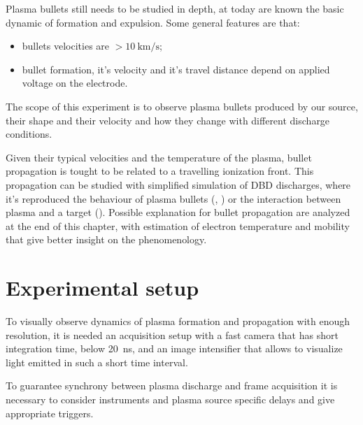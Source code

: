 Plasma bullets still needs to be studied in depth, at today are known the basic dynamic of formation and expulsion. Some general features are that:
\begin{itemize}
 \item bullets velocities are $> \SI{10}{\kilo\meter/\second}$;
 \item bullet formation, it's velocity and it's travel distance depend on applied voltage on the electrode.
\end{itemize}

The scope of this experiment is to observe plasma bullets produced by our source, their shape and their velocity and how they change with different discharge conditions.

Given their typical velocities and the temperature of the plasma, bullet propagation is tought to be related to a travelling ionization front. This propagation can be studied with simplified simulation of DBD discharges, where it's reproduced the behaviour of plasma bullets (\cite{doi:10.1063/1.4963115}, \cite{Breden_2012}) or the interaction between plasma and a target (\cite{doi:10.1063/1.4923345}). Possible explanation for bullet propagation are analyzed at the end of this chapter, with estimation of electron temperature and mobility that give better insight on the phenomenology.

\section{Experimental setup}
To visually observe dynamics of plasma formation and propagation with enough resolution, it is needed an acquisition setup with a fast camera that has short integration time, below \SI{20}{\nano\second}, and an image intensifier that allows to visualize light emitted in such a short time interval.

To guarantee synchrony between plasma discharge and frame acquisition it is necessary to consider instruments and plasma source specific delays and give appropriate triggers.

